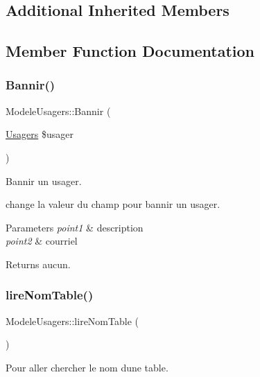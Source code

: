 \subsection*{Additional Inherited Members}


\subsection{Member Function Documentation}
\mbox{\label{class_modele_usagers_a2de8c1b03745c32172436332394963e9}} 
\subsubsection{\texorpdfstring{Bannir()}{Bannir()}}
{\footnotesize\ttfamily Modele\+Usagers\+::\+Bannir (\begin{DoxyParamCaption}\item[{\hyperlink{class_usagers}{Usagers}}]{\$usager }\end{DoxyParamCaption})}



Bannir un usager. 

change la valeur du champ pour bannir un usager. 
\begin{DoxyParams}{Parameters}
{\em point1} & description \\
\hline
{\em point2} & courriel \\
\hline
\end{DoxyParams}
\begin{DoxyReturn}{Returns}
aucun. 
\end{DoxyReturn}
\mbox{\label{class_modele_usagers_a42d4bd0440380ccaec209c06c3d69a81}} 
\subsubsection{\texorpdfstring{lire\+Nom\+Table()}{lireNomTable()}}
{\footnotesize\ttfamily Modele\+Usagers\+::lire\+Nom\+Table (\begin{DoxyParamCaption}{ }\end{DoxyParamCaption})}



Pour aller chercher le nom d\textquotesingle{}une table. 

